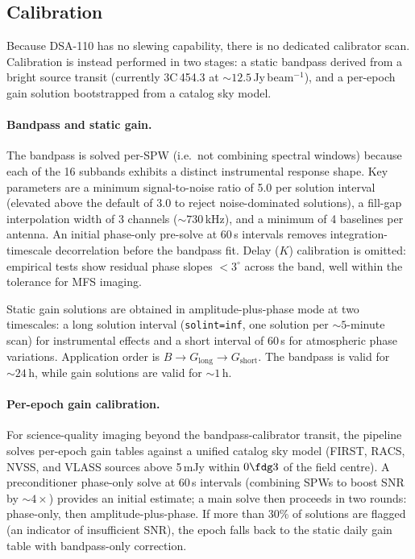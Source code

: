 \documentclass[twocolumn,11pt]{article}
\newcommand{\dsa}{DSA-110\xspace}
\newcommand{\jybeam}{Jy\,beam$^{-1}$\xspace}
\begin{document}
\subsection{Calibration}\label{sec:calibration}

Because \dsa has no slewing capability, there is no dedicated calibrator
scan.  Calibration is instead performed in two stages: a static bandpass
derived from a bright source transit (currently 3C\,454.3 at
$\sim\!12.5$\,\jybeam), and a per-epoch gain solution bootstrapped from
a catalog sky model.

\paragraph{Bandpass and static gain.}
The bandpass is solved per-SPW (i.e.\ not combining spectral windows)
because each of the 16 subbands exhibits a distinct instrumental
response shape.  Key parameters are a minimum signal-to-noise ratio of
5.0 per solution interval (elevated above the default of 3.0 to reject
noise-dominated solutions), a fill-gap interpolation width of 3 channels
($\sim\!730$\,kHz), and a minimum of 4 baselines per antenna.  An
initial phase-only pre-solve at 60\,s intervals removes
integration-timescale decorrelation before the bandpass fit.  Delay
($K$) calibration is omitted: empirical tests show residual phase slopes
$<3^{\circ}$ across the band, well within the tolerance for MFS imaging.

Static gain solutions are obtained in amplitude-plus-phase mode at two
timescales: a long solution interval (\texttt{solint=inf}, one solution
per $\sim\!5$-minute scan) for instrumental effects and a short interval
of 60\,s for atmospheric phase variations.  Application order is $B
\rightarrow G_{\mathrm{long}} \rightarrow G_{\mathrm{short}}$.  The
bandpass is valid for $\sim\!24$\,h, while gain solutions are valid for
$\sim\!1$\,h.

\paragraph{Per-epoch gain calibration.}
For science-quality imaging beyond the bandpass-calibrator transit, the
pipeline solves per-epoch gain tables against a unified catalog sky model
(FIRST, RACS, NVSS, and VLASS sources above 5\,mJy within $0\fdg3$ of
the field centre).  A preconditioner phase-only solve at 60\,s intervals
(combining SPWs to boost SNR by $\sim\!4\times$) provides an initial
estimate; a main solve then proceeds in two rounds: phase-only, then
amplitude-plus-phase.  If more than 30\% of solutions are flagged (an
indicator of insufficient SNR), the epoch falls back to the static daily
gain table with bandpass-only correction.
\end{document}
